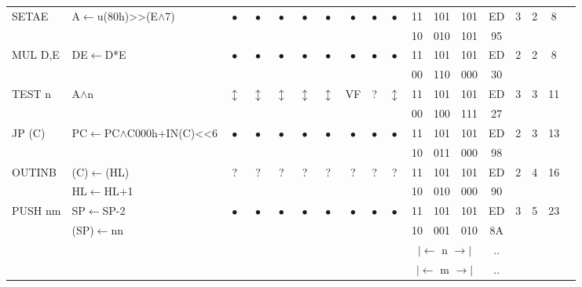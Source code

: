\documentclass[oneside,a4paper]{book}
\newcommand{\instrt}{\rule{0pt}{2.7ex}}
\newcommand{\instrb}{\rule[-1.7ex]{0pt}{0pt}}
\begin{document}
{\begin{tabular}{llcccccccccccccccl}
		SETAE\instrt & 
			A$\leftarrow$u(80h)>>(E$\wedge$7)\footnotemark[1] & 
			$\bullet$ & 
				$\bullet$ & 
				$\bullet$ & 
				$\bullet$ & 
				$\bullet$ & 
				$\bullet$ & 
				$\bullet$ & 
				$\bullet$ &
			11 & 101 & 101 & 
			ED & 3 &
			2 & 8 & \\
			\multicolumn{10}{c}{} & 10 & 010 & 101 & 95 & \instrb \\

		MUL D,E\instrt & 
			DE$\leftarrow$D*E & 
			$\bullet$ & 
				$\bullet$ & 
				$\bullet$ & 
				$\bullet$ & 
				$\bullet$ & 
				$\bullet$ & 
				$\bullet$ & 
				$\bullet$ &
			11 & 101 & 101 & 
			ED & 2 &
			2 & 8 & \\
			\multicolumn{10}{c}{} & 00 & 110 & 000 & 30 & \instrb \\

		TEST n\instrt & 
			A$\wedge$n & 
			$\updownarrow$ & 
				$\updownarrow$ & 
				$\updownarrow$ & 
				$\updownarrow$ & 
				$\updownarrow$ & 
				VF & 
				? & 
				$\updownarrow$ & 
			11 & 101 & 101 & 
			ED & 3 &
			3 & 11 & \\
			\multicolumn{10}{c}{} & 00 & 100 & 111 & 27 & \instrb \\

		JP (C)\instrt & 
			PC$\leftarrow$PC$\wedge$C000h+IN(C)<<6 & 
			$\bullet$ & 
				$\bullet$ & 
				$\bullet$ & 
				$\bullet$ & 
				$\bullet$ & 
				$\bullet$ & 
				$\bullet$ & 
				$\bullet$ &
			11 & 101 & 101 & 
			ED & 2 & 
			3 & 13 & \\
			\multicolumn{10}{c}{} & 10 & 011 & 000 & 98 & \instrb \\
			
		OUTINB\instrt & 
			(C)$\leftarrow$(HL) & 
			? & 
				? & 
				? & 
				? & 
				? & 
				? & 
				? & 
				? & 
			11 & 101 & 101 & 
			ED & 2 & 
			4 & 16 & \\
			& HL$\leftarrow$HL+1 & \multicolumn{8}{c}{} & 10 & 010 & 000 & 90 & \instrb \\

		PUSH nm\instrt\footnotemark[2] & 
			SP$\leftarrow$SP-2 & 
			$\bullet$ & 
				$\bullet$ & 
				$\bullet$ & 
				$\bullet$ & 
				$\bullet$ & 
				$\bullet$ & 
				$\bullet$ & 
				$\bullet$ &
			11 & 101 & 101 & 
			ED & 3 &
			5 & 23 & \\
			& (SP)$\leftarrow$nn & \multicolumn{8}{c}{} & 10 & 001 & 010 & 8A & \\
			\multicolumn{10}{c}{} & \multicolumn{3}{c}{$|\longleftarrow$ n $\longrightarrow|$} & .. & \\
			\multicolumn{10}{c}{} & \multicolumn{3}{c}{$|\longleftarrow$ m $\longrightarrow|$} & .. & \instrb \\
	

\end{tabular}}
\end{document}
